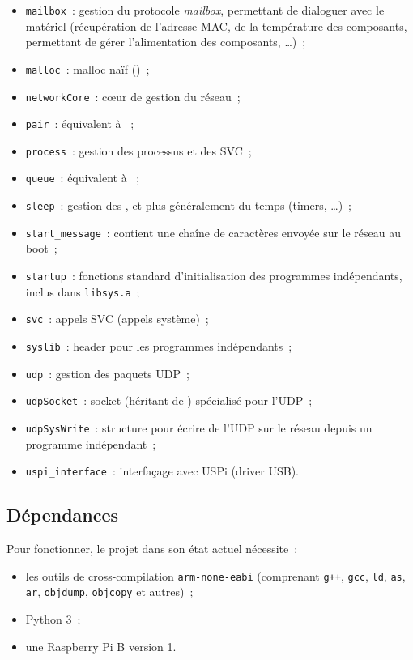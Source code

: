 \documentclass[11pt,a4paper]{article}
\newcommand{\fname}[1]{\texttt{#1}} %
\begin{document}
\begin{itemize}
	\item \fname{mailbox}~: gestion du protocole \textit{mailbox}, permettant
		de dialoguer avec le matériel (récupération de l'adresse MAC, 
		de la température des composants, permettant de gérer l'alimentation
		des composants, \ldots)~;
	\item \fname{malloc}~: malloc naïf ()~;
	\item \fname{networkCore}~: cœur de gestion du réseau~;
	\item \fname{pair}~: équivalent à ~;
	\item \fname{process}~: gestion des processus et des SVC~;
	\item \fname{queue}~: équivalent à ~;
	\item \fname{sleep}~: gestion des , et plus généralement
		du temps (timers, \ldots)~;
	\item \fname{start\_message}~: contient une chaîne de caractères envoyée
		sur le réseau au boot~;
	\item \fname{startup}~: fonctions standard d'initialisation des programmes
		indépendants, inclus dans \fname{libsys.a}~;
	\item \fname{svc}~: appels SVC (appels système)~;
	\item \fname{syslib}~: header pour les programmes indépendants~;
	\item \fname{udp}~: gestion des paquets UDP~;
	\item \fname{udpSocket}~: socket (héritant de )
		spécialisé pour l'UDP~;
	\item \fname{udpSysWrite}~: structure pour écrire de l'UDP sur le
		réseau depuis un programme indépendant~;
	\item \fname{uspi\_interface}~: interfaçage avec USPi (driver USB).
\end{itemize}

\subsection{Dépendances}

Pour fonctionner, le projet dans son état actuel nécessite~:
\begin{itemize}
	\item les outils de cross-compilation \texttt{arm-none-eabi} (comprenant
		\fname{g++}, \fname{gcc}, \fname{ld}, \fname{as}, \fname{ar},
		\fname{objdump}, \fname{objcopy} et autres)~;
	\item Python 3~;
	\item une Raspberry Pi B version 1.
\end{itemize}
\end{document}
